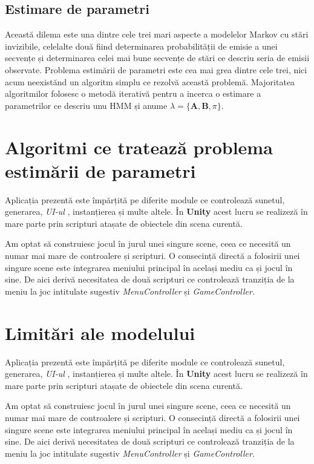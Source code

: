 \subsection{Estimare de parametri}
Această dilema este una dintre cele trei mari aspecte a modelelor Markov cu stări invizibile, celelalte două fiind determinarea probabilității de emisie a unei secvențe și determinarea celei mai bune secvențe de stări ce descriu seria de emisii observate. Problema estimării de parametri este cea mai grea dintre cele trei, nici acum neexistănd un algoritm simplu ce rezolvă această problemă. Majoritatea algoritmilor folosesc o metodă iterativă pentru a incerca o estimare a parametrilor ce descriu unu HMM și anume $\lambda = \{\textbf{A},\textbf{B},\pi\}$.\par

\section{Algoritmi ce tratează problema estimării de parametri}
Aplicația prezentă este împărțită pe diferite module ce controlează sunetul, generarea, \textit{UI-ul} , instanțierea și multe altele. În \textbf{Unity} acest lucru se realizeză în mare parte prin scripturi atașate de obiectele din scena curentă. \par
Am optat să construiesc jocul în jurul unei singure scene, ceea ce necesită un numar mai mare de controalere și scripturi. O consecință directă a folosirii unei singure scene este integrarea meniului principal în același mediu ca și jocul în sine. De aici derivă necesitatea de două scripturi ce controlează tranziția de la meniu la joc intitulate sugestiv \textit{MenuController} și \textit{GameController}.\par

\section{Limitări ale modelului}
Aplicația prezentă este împărțită pe diferite module ce controlează sunetul, generarea, \textit{UI-ul} , instanțierea și multe altele. În \textbf{Unity} acest lucru se realizeză în mare parte prin scripturi atașate de obiectele din scena curentă. \par
Am optat să construiesc jocul în jurul unei singure scene, ceea ce necesită un numar mai mare de controalere și scripturi. O consecință directă a folosirii unei singure scene este integrarea meniului principal în același mediu ca și jocul în sine. De aici derivă necesitatea de două scripturi ce controlează tranziția de la meniu la joc intitulate sugestiv \textit{MenuController} și \textit{GameController}.\par

